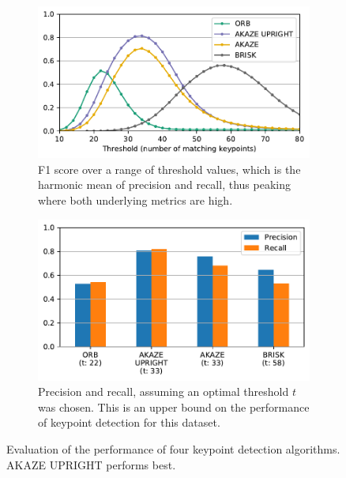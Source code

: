 \documentclass{ltjarticle}
\begin{document}
\begin{figure}
     \centering
     \begin{subfigure}[b]{\textwidth}
         \centering
         \includegraphics[width=\textwidth]{keypoints_f1}
         \caption{F1 score over a range of threshold values, which is the harmonic mean of precision and recall, thus peaking where both underlying metrics are high.}
         \label{fig:keypoint-evaluation-f1}
     \end{subfigure}
     \begin{subfigure}[b]{\textwidth}
         \centering
         \includegraphics[width=\textwidth]{keypoints_optimal}
         \caption{\textcolor{mplblue}{Precision} and \textcolor{mplorange}{recall}, assuming an optimal threshold $t$ was chosen. This is an upper bound on the performance of keypoint detection for this dataset.}
     \end{subfigure}
        \caption{Evaluation of the performance of four keypoint detection algorithms. AKAZE UPRIGHT performs best.}
        \label{fig:keypoint-evaluation}
\end{figure}
\end{document}
